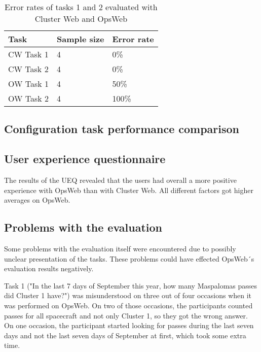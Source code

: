 \begin{table}[!ht]
\def\arraystretch{1.1}%
    \begin{center}
    \caption{Error rates of tasks 1 and 2 evaluated with Cluster Web and OpsWeb}
    \label{cw_ow_errors}
    \begin{tabular}{| l | l | l | }
    \hline
    Task & Sample size & Error rate  \\
    \hline
    CW Task 1    &  4 & 0\%       \\
    CW Task 2    &  4 & 0\%       \\
    OW Task 1    &  4 & 50\%       \\
    OW Task 2    &  4 & 100\%       \\
    \hline
    \end{tabular}
    \end{center}
\end{table}

\subsection{Configuration task performance comparison}

\subsection{User experience questionnaire}
The results of the UEQ revealed that the users had overall a more positive experience with OpsWeb than with Cluster Web. All different factors got higher averages on OpsWeb.


\subsection{Problems with the evaluation} \label{evaluation_problems}
Some problems with the evaluation itself were encountered due to possibly unclear presentation of the tasks. These problems could have effected OpsWeb´s evaluation results negatively.

Task 1 ("In the last 7 days of September this year, how many Maspalomas passes did Cluster 1 have?") was misunderstood on three out of four occasions when it was performed on OpsWeb. On two of those occasions, the participants counted passes for all spacecraft and not only Cluster 1, so they got the wrong answer. On one occasion, the participant started looking for passes during the last seven days and not the last seven days of September at first, which took some extra time.

